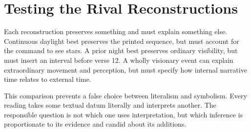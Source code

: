 \section{Testing the Rival Reconstructions}

Each reconstruction preserves something and must explain something else.
Continuous daylight best preserves the printed sequence, but must account for
the command to see stars. A prior night best preserves ordinary visibility,
but must insert an interval before verse 12. A wholly visionary event can
explain extraordinary movement and perception, but must specify how internal
narrative time relates to external time.

This comparison prevents a false choice between literalism and symbolism.
Every reading takes some textual datum literally and interprets another. The
responsible question is not which one uses interpretation, but which inference
is proportionate to its evidence and candid about its additions.

